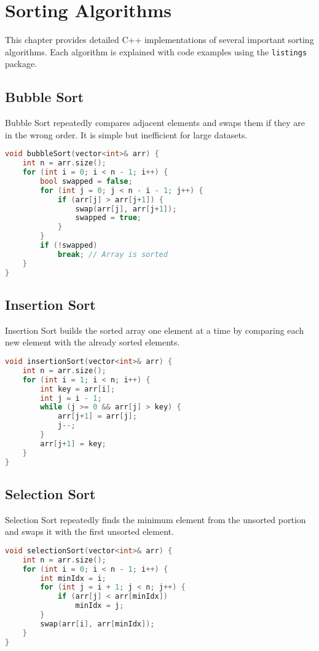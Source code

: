 \chapter{Sorting Algorithms}

This chapter provides detailed C++ implementations of several important sorting algorithms. Each algorithm is explained with code examples using the \texttt{listings} package.

\section{Bubble Sort}
Bubble Sort repeatedly compares adjacent elements and swaps them if they are in the wrong order. It is simple but inefficient for large datasets.

\begin{lstlisting}[language=C++, caption={Bubble Sort Implementation}]
void bubbleSort(vector<int>& arr) {
    int n = arr.size();
    for (int i = 0; i < n - 1; i++) {
        bool swapped = false;
        for (int j = 0; j < n - i - 1; j++) {
            if (arr[j] > arr[j+1]) {
                swap(arr[j], arr[j+1]);
                swapped = true;
            }
        }
        if (!swapped)
            break; // Array is sorted
    }
}
\end{lstlisting}

\section{Insertion Sort}
Insertion Sort builds the sorted array one element at a time by comparing each new element with the already sorted elements.

\begin{lstlisting}[language=C++, caption={Insertion Sort Implementation}]
void insertionSort(vector<int>& arr) {
    int n = arr.size();
    for (int i = 1; i < n; i++) {
        int key = arr[i];
        int j = i - 1;
        while (j >= 0 && arr[j] > key) {
            arr[j+1] = arr[j];
            j--;
        }
        arr[j+1] = key;
    }
}
\end{lstlisting}

\section{Selection Sort}
Selection Sort repeatedly finds the minimum element from the unsorted portion and swaps it with the first unsorted element.

\begin{lstlisting}[language=C++, caption={Selection Sort Implementation}]
void selectionSort(vector<int>& arr) {
    int n = arr.size();
    for (int i = 0; i < n - 1; i++) {
        int minIdx = i;
        for (int j = i + 1; j < n; j++) {
            if (arr[j] < arr[minIdx])
                minIdx = j;
        }
        swap(arr[i], arr[minIdx]);
    }
}
\end{lstlisting}


